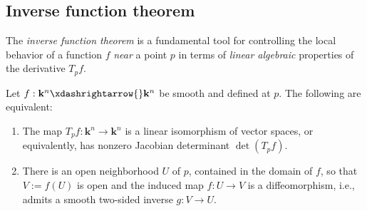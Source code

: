 \documentclass[reqno]{amsart} 
\begin{document}
\subsection{Inverse function theorem\label{sec:calc-inv-func-thm}}
\label{sec:org81b78cb}
The \emph{inverse function
  theorem} is a fundamental tool
for controlling the local behavior of a function $f$
\emph{near} a point
$p$ 
in terms of \emph{linear algebraic} properties
of the derivative $T_p f$.
\begin{theorem}\label{thm:inverse-function-theorem-euclidean}
  Let $f : \mathbf{k}^n \xdashrightarrow{} \mathbf{k}^n$
  be smooth and defined at $p$.
  The following are equivalent:
  \begin{enumerate}
  \item The map $T_p f : \mathbf{k}^n \rightarrow
    \mathbf{k}^n$
    is a linear isomorphism of vector spaces,
    or equivalently, has nonzero Jacobian determinant $\det(T_p
    f)$.
  \item
    There is an open neighborhood $U$ of $p$,
    contained in the domain of $f$,
    so that
    $V := f(U)$ is open
    and the induced map
    $f : U \rightarrow V$ is a diffeomorphism,
    i.e., admits a smooth two-sided inverse
    $g : V \rightarrow U$.
  \end{enumerate}
\end{theorem}
\end{document}
